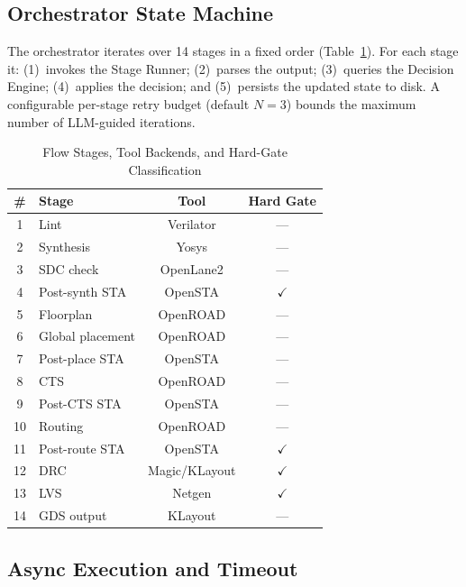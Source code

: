\documentclass[conference]{IEEEtran}
\begin{document}
\subsection{Orchestrator State Machine}

The orchestrator iterates over 14 stages in a fixed order
(Table~\ref{tab:stages}).
For each stage it: (1)~invokes the Stage Runner; (2)~parses the output;
(3)~queries the Decision Engine; (4)~applies the decision; and
(5)~persists the updated state to disk.
A configurable per-stage retry budget (default $N\!=\!3$) bounds the
maximum number of LLM-guided iterations.

\begin{table}[t]
\caption{Flow Stages, Tool Backends, and Hard-Gate Classification}
\label{tab:stages}
\centering
\setlength{\tabcolsep}{4pt}
\small
\begin{tabular}{clcc}
\toprule
\textbf{\#} & \textbf{Stage} & \textbf{Tool} & \textbf{Hard Gate} \\
\midrule
1  & Lint              & Verilator     & --- \\
2  & Synthesis         & Yosys         & --- \\
3  & SDC check         & OpenLane2     & --- \\
4  & Post-synth STA    & OpenSTA       & $\checkmark$ \\
5  & Floorplan         & OpenROAD      & --- \\
6  & Global placement  & OpenROAD      & --- \\
7  & Post-place STA    & OpenSTA       & --- \\
8  & CTS               & OpenROAD      & --- \\
9  & Post-CTS STA      & OpenSTA       & --- \\
10 & Routing           & OpenROAD      & --- \\
11 & Post-route STA    & OpenSTA       & $\checkmark$ \\
12 & DRC               & Magic/KLayout & $\checkmark$ \\
13 & LVS               & Netgen        & $\checkmark$ \\
14 & GDS output        & KLayout       & --- \\
\bottomrule
\end{tabular}
\end{table}

\subsection{Async Execution and Timeout}
\end{document}

